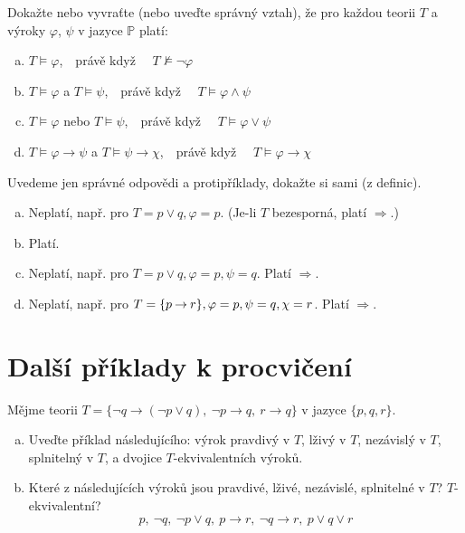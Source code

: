 \begin{problem}

    Dokažte nebo vyvraťte (nebo uveďte správný vztah), že pro každou teorii $T$ a výroky $\varphi$, $\psi$ v jazyce $\mathbb{P}$ platí:
    \begin{enumerate}[(a)]
        \item $T \models \varphi$,\ \  právě když \ \ $T \not\models \neg \varphi$
        \item $T \models \varphi$ a $T \models \psi$,\ \ právě když \ \ $T \models \varphi \wedge \psi$
        \item $T \models \varphi$ nebo $T \models \psi$,\ \ právě když \ \ $T \models \varphi \vee \psi$
        \item $T \models \varphi \to \psi$ a $T \models \psi \to \chi$,\ \ právě když \ \ $T \models \varphi \to \chi$
    \end{enumerate}

    \begin{solution} 
        Uvedeme jen správné odpovědi a protipříklady, dokažte si sami (z definic).      
        \begin{enumerate}[(a)]
            \item Neplatí, např. pro $T=p\lor q,\varphi=p$. (Je-li $T$ bezesporná, platí $\Rightarrow$.)
            \item Platí.
            \item Neplatí, např. pro $T=p\lor q,\varphi=p,\psi=q$. Platí $\Rightarrow$.
            \item Neplatí, např. pro $T=\{p\mathbin{\rightarrow} r\},\varphi=p,\psi=q,\chi=r$. Platí $\Rightarrow$. 
        \end{enumerate}              
    \end{solution}
    
\end{problem}


\section*{Další příklady k procvičení}


\begin{problem}
        
    Mějme teorii $T=\{\neg q \to (\neg p \vee q),\ \neg p \to q,\ r \to q\}$ v jazyce $\{p, q, r\}$.
    \begin{enumerate}[(a)]
        \item Uveďte příklad následujícího: výrok pravdivý v $T$, lživý v $T$, nezávislý v $T$, splnitelný v $T$, a dvojice $T$-ekvivalentních výroků.
        \item Které z následujících výroků jsou pravdivé, lživé, nezávislé, splnitelné v $T$? $T$-ekvivalentní? 
        $$
        p, \ \neg q, \ \neg p\vee q, \ p\to r,\ \neg q\to r, \ p\vee q\vee r
        $$
    \end{enumerate}

\end{problem}


